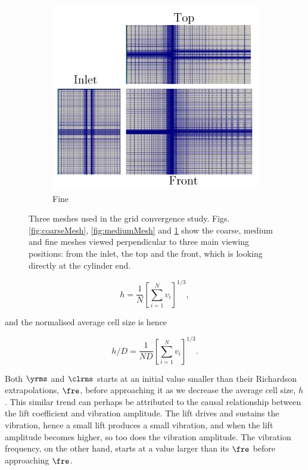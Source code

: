 \documentclass[a4paper,fleqn]{cas-sc}
\begin{document}
\begin{figure}
  \begin{subfigure}[h]{0.3\textwidth}
    \includegraphics[width=\textwidth]{figs/figure6c}
    \caption{Fine}
    \label{fig:fineMesh}
  \end{subfigure}

  \caption{Three meshes used in the grid convergence study. Figs. \ref{fig:coarseMesh}, \ref{fig:mediumMesh} and \ref{fig:fineMesh} show the coarse, medium and fine meshes viewed perpendicular to three main viewing positions: from the inlet, the top and the front, which is looking directly at the cylinder end.} \label{fig:convergenceStudy}
\end{figure}

\begin{equation}
  h = \frac{1}{N} \left [ \sum_{i=1}^{N} v_{i} \right ]^{1/3},
  \label{eq:averageCellSize}
\end{equation}

\noindent and the normalised average cell size is hence 


\begin{equation}
  h/D = \frac{1}{ND} \left [ \sum_{i=1}^{N} v_{i} \right ]^{1/3}.
  \label{eq:normAveCellSize}
\end{equation}

Both $\yrms$ and $\clrms$ starts at an initial value smaller than their Richardson extrapolations, $\fre$, before approaching it as we decrease the average cell size, $h$. This similar trend can perhaps be attributed to the causal relationship between the lift coefficient and vibration amplitude. The lift drives and sustains the vibration, hence a small lift produces a small vibration, and when the lift amplitude becomes higher, so too does the vibration amplitude. The vibration frequency, on the other hand, starts at a value larger than its $\fre$ before approaching $\fre$.
\end{document}
